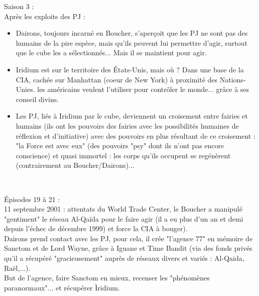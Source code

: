 \documentclass[11pt,twoside,a4paper]{book}
\begin{document}
Saison 3 : ~\\
Apr{\`e}s les exploits des PJ : ~\\
\begin{itemize}
	\item Dairons, toujours incarn{\'e} en Boucher, s'aper\c{c}oit que les PJ ne sont pas des humains de la pire esp{\`e}ce, mais qu'ils peuvent lui permettre d'agir, surtout que le cube les a s{\'e}lectionn{\'e}s... Mais il se maintient pour agir.
	\item Iridium est sur le territoire des {\'E}tats-Unis, mais o{\`u} ? Dans une base de la CIA, cach{\'e}e sur Manhattan (coeur de New York) {\`a} proximit{\'e} des Nations-Unies. les am{\'e}ricains veulent l'utiliser pour contr{\^o}ler le monde... gr{\^a}ce {\`a} ses conseil divins.
	\item Les PJ, li{\'e}s {\`a} Iridium par le cube, deviennent un croisement entre fairies et humains (ils ont les pouvoirs des fairies avec les possibilit{\'e}s humaines de r{\'e}flexion et d'initiative) avec des pouvoirs en plus r{\'e}sultant de ce croisement : "la Force est avec eux" (des pouvoirs "psy" dont ils n'ont pas encore conscience) et quasi immortel : les corps qu'ils occupent se reg{\'e}n{\`e}rent (contrairement au Boucher/Dairons)...
\end{itemize}~\\

\clearpage

{\'E}pisodes 19 {\`a} 21 : ~\\
11 septembre 2001 : attentats du World Trade Center, le Boucher a manipul{\'e} "gentiment" le r{\'e}seau Al-Qa{\"i}da pour le faire agir (il a eu plus d'un an et demi depuis l'{\'e}chec de d{\'e}cembre 1999) et force la CIA {\`a} bouger). ~\\
Dairons prend contact avec les PJ, pour cela, il cr{\'e}e "l'agence 77" en m{\'e}moire de Sanctom et de Lord Wayne, gr{\^a}ce {\`a} Iguane et Time Bandit (via des fonds priv{\'e}s qu'il a r{\'e}cup{\'e}r{\'e} "gracieusement" aupr{\`e}s de r{\'e}seaux divers et vari{\'e}s : Al-Qaida, Ra{\"e}l,...). ~\\
But de l'agence, faire Sanctom en mieux, recenser les "ph{\'e}nom{\`e}nes paranormaux"... et r{\'e}cup{\'e}rer {\`I}ridium. ~\\
\end{document}
